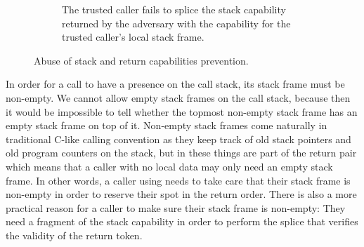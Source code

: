 \documentclass[acmsmall,screen]{acmart}\settopmatter{}
\begin{document}
\begin{figure}
\begin{subfigure}{0.4\linewidth}
    \caption{The trusted caller fails to splice the stack capability returned by
    the adversary with the capability for the trusted caller's local stack frame.}
    \label{fig:ret-ptr-abuse-prev}
  \end{subfigure}
  \caption{Abuse of stack and return capabilities prevention.}
\end{figure}

In order for a call to have a presence on the call stack, its stack frame must be non-empty.
We cannot allow empty stack frames on the call stack, because then it would be impossible to tell whether the topmost non-empty stack frame has an empty stack frame on top of it.
Non-empty stack frames come naturally in traditional C-like calling convention as they keep track of old stack pointers and old program counters on the stack, but in \stktokens{} these things are part of the return pair which means that a caller with no local data may only need an empty stack frame.
In other words, a caller using \stktokens{} needs to take care that their stack frame is non-empty in order to reserve their spot in the return order.
There is also a more practical reason for a \stktokens{} caller to make sure their stack frame is non-empty: They need a fragment of the stack capability in order to perform the splice that verifies the validity of the return token.
\end{document}
